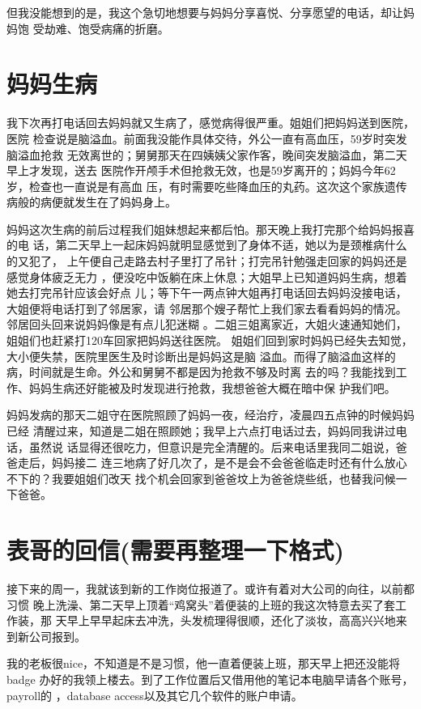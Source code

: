 \documentclass[12pt]{book}
\begin{document}
但我没能想到的是，我这个急切地想要与妈妈分享喜悦、分享愿望的电话，却让妈妈饱
受劫难、饱受病痛的折磨。
\section{妈妈生病}
\label{sec-9-48}

我下次再打电话回去妈妈就又生病了，感觉病得很严重。姐姐们把妈妈送到医院，医院
检查说是脑溢血。前面我没能作具体交待，外公一直有高血压，59岁时突发脑溢血抢救
无效离世的；舅舅那天在四姨姨父家作客，晚间突发脑溢血，第二天早上才发现，送去
医院作开颅手术但抢救无效，也是59岁离开的；妈妈今年62岁，检查也一直说是有高血
压，有时需要吃些降血压的丸药。这次这个家族遗传病般的病便就发生在了妈妈身上。

妈妈这次生病的前后过程我们姐妹想起来都后怕。那天晚上我打完那个给妈妈报喜的电
话，第二天早上一起床妈妈就明显感觉到了身体不适，她以为是颈椎病什么的又犯了，
上午便自己走路去村子里打了吊针；打完吊针勉强走回家的妈妈还是感觉身体疲乏无力
，便没吃中饭躺在床上休息；大姐早上已知道妈妈生病，想着她去打完吊针应该会好点
儿；等下午一两点钟大姐再打电话回去妈妈没接电话，大姐便将电话打到了邻居家，请
邻居那个嫂子帮忙上我们家去看看妈妈的情况。邻居回头回来说妈妈像是有点儿犯迷糊
。二姐三姐离家近，大姐火速通知她们，姐姐们也赶紧打120车回家把妈妈送往医院。
姐姐们回到家时妈妈已经失去知觉，大小便失禁，医院里医生及时诊断出是妈妈这是脑
溢血。而得了脑溢血这样的病，时间就是生命。外公和舅舅不都是因为抢救不够及时离
去的吗？我能找到工作、妈妈生病还好能被及时发现进行抢救，我想爸爸大概在暗中保
护我们吧。

妈妈发病的那天二姐守在医院照顾了妈妈一夜，经治疗，凌晨四五点钟的时候妈妈已经
清醒过来，知道是二姐在照顾她；我早上六点打电话过去，妈妈同我讲过电话，虽然说
话显得还很吃力，但意识是完全清醒的。后来电话里我同二姐说，爸爸走后，妈妈接二
连三地病了好几次了，是不是会不会爸爸临走时还有什么放心不下的？我要姐姐们改天
找个机会回家到爸爸坟上为爸爸烧些纸，也替我问候一下爸爸。
\section{表哥的回信(需要再整理一下格式)}
\label{sec-9-49}

接下来的周一，我就该到新的工作岗位报道了。或许有着对大公司的向往，以前都习惯
晚上洗澡、第二天早上顶着“鸡窝头”着便装的上班的我这次特意去买了套工作装，那
天早上早早起床去冲洗，头发梳理得很顺，还化了淡妆，高高兴兴地来到新公司报到。

我的老板很nice，不知道是不是习惯，他一直着便装上班，那天早上把还没能将badge
办好的我领上楼去。到了工作位置后又借用他的笔记本电脑早请各个账号，payroll的
，database access以及其它几个软件的账户申请。
\end{document}
